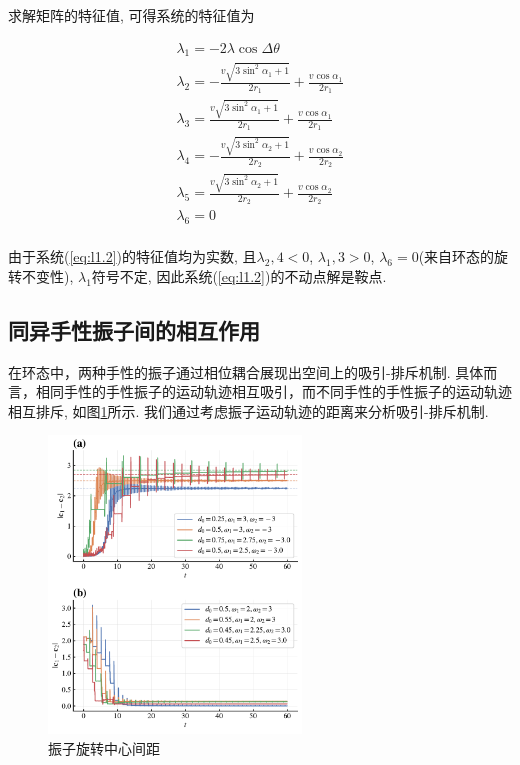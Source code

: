 \documentclass{article}
\begin{document}
求解矩阵的特征值, 可得系统的特征值为

$$
\begin{array}{l}
	\lambda _1=-2\lambda \cos \Delta \theta\\
	\lambda _2=-\frac{v\sqrt{3\sin ^2\alpha _1+1}}{2r_1}+\frac{v\cos \alpha _1}{2r_1}\\
	\lambda _3=\frac{v\sqrt{3\sin ^2\alpha _1+1}}{2r_1}+\frac{v\cos \alpha _1}{2r_1}\\
	\lambda _4=-\frac{v\sqrt{3\sin ^2\alpha _2+1}}{2r_2}+\frac{v\cos \alpha _2}{2r_2}\\
	\lambda _5=\frac{v\sqrt{3\sin ^2\alpha _2+1}}{2r_2}+\frac{v\cos \alpha _2}{2r_2}\\
	\lambda _6=0\\
\end{array}
$$

由于系统(\ref{eq:l1.2})的特征值均为实数, 且$\lambda _2,4<0$, $\lambda _1,3>0$, $\lambda _6=0$(来自环态的旋转不变性), $\lambda _1$符号不定, 因此系统(\ref{eq:l1.2})的不动点解是鞍点. 

\newpage
\subsection{同异手性振子间的相互作用}

在环态中，两种手性的振子通过相位耦合展现出空间上的吸引-排斥机制. 具体而言，相同手性的手性振子的运动轨迹相互吸引，而不同手性的手性振子的运动轨迹相互排斥, 如图\ref{fig:2OsCenterDistance}所示. 我们通过考虑振子运动轨迹的距离来分析吸引-排斥机制.

\begin{figure}[H]
    \centering
    \includegraphics[width=0.6\textwidth]{./figs/2OsCenterDistance.pdf}
    \caption{振子旋转中心间距}
    \label{fig:2OsCenterDistance}
\end{figure}
\end{document}
